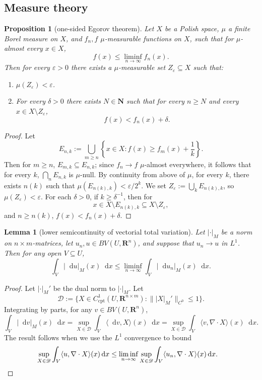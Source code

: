\documentclass[reqno,11pt]{amsart}
\newcommand{\NN}{\mathbf{N}}
\newcommand{\RR}{\mathbf{R}}
\newcommand*\dif{\mathop{}\!\mathrm{d}}
\newcommand{\cpt}{\mathrm{cpt}}
\newtheorem{lemma}[theorem]{Lemma}
\newtheorem{proposition}[theorem]{Proposition}
\theoremstyle{definition}
\numberwithin{equation}{section}
\begin{document}
\subsection{Measure theory}
\begin{proposition}[one-sided Egorov theorem]\label{one sided Egorov}
Let $X$ be a Polish space, $\mu$ a finite Borel measure on $X$, and $f_n, f$ $\mu$-measurable functions on $X$, such that for $\mu$-almost every $x \in X$,
$$f(x) \leq \liminf_{n \to \infty} f_n(x).$$
Then for every $\varepsilon > 0$ there exists a $\mu$-measurable set $Z_\varepsilon \subseteq X$ such that:
\begin{enumerate}
\item $\mu(Z_\varepsilon) < \varepsilon$.
\item For every $\delta > 0$ there exists $N \in \NN$ such that for every $n \geq N$ and every $x \in X \setminus Z_\varepsilon$,
$$f(x) < f_n(x) + \delta.$$
\end{enumerate}
\end{proposition}
\begin{proof}
Let 
$$E_{n, k} := \bigcup_{m \geq n} \left\{x \in X: f(x) \geq f_m(x) + \frac{1}{k}\right\}.$$
Then for $m \geq n$, $E_{m, k} \subseteq E_{n, k}$; since $f_n \to f$ $\mu$-almost everywhere, it follows that for every $k$, $\bigcap_n E_{n, k}$ is $\mu$-null.
By continuity from above of $\mu$, for every $k$, there exists $n(k)$ such that $\mu(E_{n(k), k}) < \varepsilon/2^k$.
We set $Z_\varepsilon := \bigcup_k E_{n(k), k}$, so $\mu(Z_\varepsilon) < \varepsilon$.
For each $\delta > 0$, if $k \geq \delta^{-1}$, then for
$$x \in X \setminus E_{n(k), k} \subseteq X \setminus Z_\varepsilon,$$
and $n \geq n(k)$, $f(x) < f_n(x) + \delta$.
\end{proof}

\begin{lemma}[lower semicontinuity of vectorial total variation]\label{TV lower semicontinuity}
Let $|\cdot|_M$ be a norm on $n \times m$-matrices, let $u_n, u \in BV(U, \RR^n)$, and suppose that $u_n \to u$ in $L^1$.
Then for any open $V \subseteq U$,
$$\int_V |\dif u|_M(x) \dif x \leq \liminf_{n \to \infty} \int_V |\dif u_n|_M(x) \dif x.$$
\end{lemma}
\begin{proof}
Let $|\cdot|_M'$ be the dual norm to $|\cdot|_M$.
Let
$$\mathscr D := \{X \in C^1_\cpt(U, \RR^{n \times m}): \||X|_M'\|_{C^0} \leq 1\}.$$
Integrating by parts, for any $v \in BV(U, \RR^n)$, 
$$\int_V |\dif v|_M(x) \dif x = \sup_{X \in \mathscr D} \int_V \langle \dif v, X\rangle(x) \dif x = \sup_{X \in \mathscr D} \int_V \langle v, \nabla \cdot X\rangle(x) \dif x.$$
The result follows when we use the $L^1$ convergence to bound
\begin{align*}
\sup_{X \in \mathscr D} \int_V \langle u, \nabla \cdot X\rangle(x) \dif x 
&\leq \liminf_{n \to \infty} \sup_{X \in \mathscr D} \int_V \langle u_n, \nabla \cdot X\rangle(x) \dif x. \qedhere
\end{align*}
\end{proof}
\end{document}
